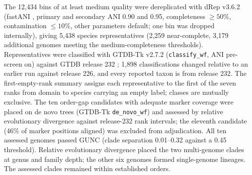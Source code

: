 The 12{,}434 bins of at least medium quality were dereplicated with dRep v3.6.2 \citep{olm2017drep}
(fastANI \citep{jain2018fastani}, primary and secondary ANI 0.90 and 0.95, completeness $\geq 50\%$,
contamination $\leq 10\%$, other parameters default; one bin was dropped internally), giving 5{,}438
species representatives (2{,}259 near-complete, 3{,}179 additional genomes meeting the medium-completeness thresholds). Representatives were classified with
GTDB-Tk v2.7.2 \citep{chaumeil2022gtdbtk} (\texttt{classify\_wf}, ANI pre-screen on) against GTDB
release 232 \citep{parks2022gtdb}; 1{,}898 classifications changed relative to an earlier run
against release 226, and every reported taxon is from release 232. The first-empty-rank summary
assigns each representative to the first of the seven ranks from domain to species carrying an empty
label; classes are mutually exclusive. The ten order-gap candidates with adequate marker coverage
were placed on de novo trees (GTDB-Tk \texttt{de\_novo\_wf}) and assessed by relative evolutionary
divergence against release-232 rank intervals; the eleventh candidate (46\% of marker positions
aligned) was excluded from adjudication. All ten assessed genomes passed GUNC (clade separation 0.01--0.32 against a 0.45 threshold). Relative evolutionary divergence placed the two multi-genome clades at genus and family depth; the other six genomes formed single-genome lineages. The assessed clades remained within established orders.



